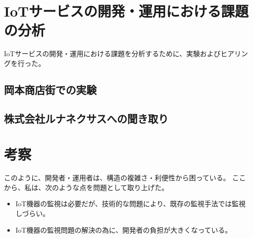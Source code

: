 \section{IoTサービスの開発・運用における課題の分析}
IoTサービスの開発・運用における課題を分析するために、実験およびヒアリングを行った。
\subsection{岡本商店街での実験}


\subsection{株式会社ルナネクサスへの聞き取り}



\section{考察}

このように、開発者・運用者は、構造の複雑さ・利便性から困っている。
ここから、私は、次のような点を問題として取り上げた。
\begin{itemize}
\item IoT機器の監視は必要だが、技術的な問題により、既存の監視手法では監視しづらい。
\item IoT機器の監視問題の解決の為に、開発者の負担が大きくなっている。
\end{itemize}


